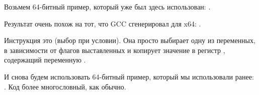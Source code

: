Возьмем 64-битный пример, который уже был здесь использован: .


Результат очень похож на тот, что GCC сгенерировал для x64: .

Инструкция \CSEL это  (выбор при условии). 
Она просто выбирает одну из переменных, в зависимости от флагов выставленных \TST и копирует значение в регистр , содержащий переменную .


И снова будем использовать 64-битный пример, который мы использовали ранее: .
Код более многословный, как обычно.




